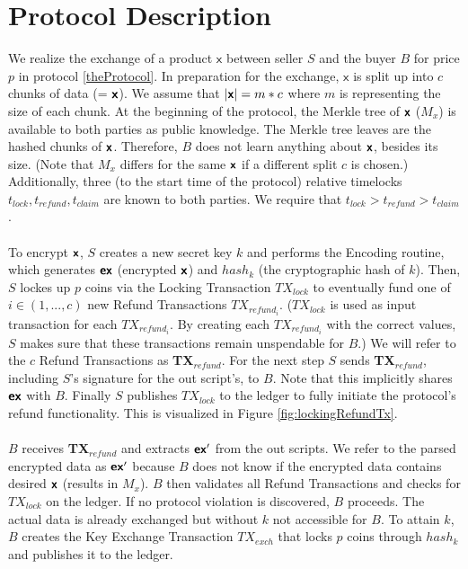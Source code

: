 \documentclass{cacthesis}
\newcounter{protocol}
\begin{document}
        \section{Protocol Description}
        We realize the exchange of a product $\textsf{x}$ between seller $S$ and the buyer $B$ for price $p$ in protocol \ref{theProtocol}. In preparation for the exchange, $\textsf{x}$ is split up into $c$ chunks of data (= $\textsf{\textbf{x}}$). We assume that $|\textsf{\textbf{x}}| = m*c $ where $m$ is representing the size of each chunk. At the beginning of the protocol, the Merkle tree of $\textsf{\textbf{x}}$ ($M_x$) is available to both parties as public knowledge. The Merkle tree leaves are the hashed chunks of $\textsf{\textbf{x}}$. Therefore, $B$ does not learn anything about $\textsf{\textbf{x}}$, besides its size. (Note that $M_x$ differs for the same $\textsf{\textbf{x}}$ if a different split $c$ is chosen.) Additionally, three (to the start time of the protocol) relative timelocks $t_{lock}, t_{refund}, t_{claim}$ are known to both parties. We require that $t_{lock} > t_{refund} > t_{claim}$. \\\\
        To encrypt $\textsf{\textbf{x}}$, $S$ creates a new secret key $k$ and performs the Encoding routine, which generates $\textsf{\textbf{ex}}$ (encrypted $\textsf{\textbf{x}}$) and $hash_k$ (the cryptographic hash of $k$). Then, $S$ lockes up $p$ coins via the Locking Transaction $TX_{lock}$ to eventually fund one of $i \in (1, ..., c)$ new Refund Transactions $TX_{{refund}_i}$. ($TX_{lock}$  is used as input transaction for each $TX_{{refund}_i}$. By creating each $TX_{{refund}_i}$ with the correct values, $S$ makes sure that these transactions remain unspendable for $B$.) We will refer to the $c$ Refund Transactions as \textbf{TX$_{{refund}}$}. For the next step $S$ sends \textbf{TX$_{{refund}}$}, including $S$'s signature for the out script's, to $B$. Note that this implicitly shares $\textsf{\textbf{ex}}$ with $B$. Finally $S$ publishes $TX_{lock}$ to the ledger to fully initiate the protocol's refund functionality. This is visualized in Figure \ref{fig:lockingRefundTx}. \\\\
        $B$ receives \textbf{TX$_{{refund}}$} and extracts $\textsf{\textbf{ex}}'$ from the out scripts. We refer to the parsed encrypted data as $\textsf{\textbf{ex}}'$ because $B$ does not know if the encrypted data contains desired $\textsf{\textbf{x}}$ (results in $M_x$). $B$ then validates all Refund Transactions and checks for $TX_{lock}$ on the ledger. If no protocol violation is discovered, $B$ proceeds. The actual data is already exchanged but without $k$ not accessible for $B$. To attain $k$, $B$ creates the Key Exchange Transaction $TX_{exch}$ that locks $p$ coins through $hash_k$ and publishes it to the ledger. \\\\
\end{document}
